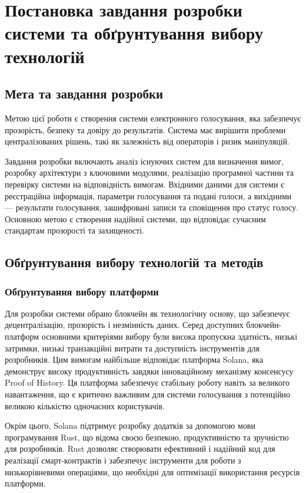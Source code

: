 \documentclass[14pt]{extreport}
\begin{document}
  \chapter{Постановка завдання розробки системи та обґрунтування вибору технологій}

  \section{Мета та завдання розробки}
  
  Метою цієї роботи є створення системи електронного голосування, яка забезпечує прозорість, безпеку та довіру до результатів. Система має вирішити проблеми централізованих рішень, такі як залежність від операторів і ризик маніпуляцій.

  Завдання розробки включають аналіз існуючих систем для визначення вимог, розробку архітектури з ключовими модулями, реалізацію програмної частини та перевірку системи на відповідність вимогам. Вхідними даними для системи є реєстраційна інформація, параметри голосування та подані голоси, а вихідними — результати голосування, зашифровані записи та сповіщення про статус голосу. Основною метою є створення надійної системи, що відповідає сучасним стандартам прозорості та захищеності.
  
  \section{Обґрунтування вибору технологій та методів}
  \subsection{Обґрунтування вибору платформи}
  
  Для розробки системи обрано блокчейн як технологічну основу, що забезпечує децентралізацію, прозорість і незмінність даних. Серед доступних блокчейн-платформ основними критеріями вибору були висока пропускна здатність, низькі затримки, низькі транзакційні витрати та доступність інструментів для розробників. Цим вимогам найбільше відповідає платформа Solana, яка демонструє високу продуктивність завдяки інноваційному механізму консенсусу Proof of History. Ця платформа забезпечує стабільну роботу навіть за великого навантаження, що є критично важливим для системи голосування з потенційно великою кількістю одночасних користувачів.

  Окрім цього, Solana підтримує розробку додатків за допомогою мови програмування Rust, що відома своєю безпекою, продуктивністю та зручністю для розробників. Rust дозволяє створювати ефективний і надійний код для реалізації смарт-контрактів і забезпечує інструменти для роботи з низькорівневими операціями, що необхідні для оптимізації використання ресурсів платформи.
  
\end{document}
